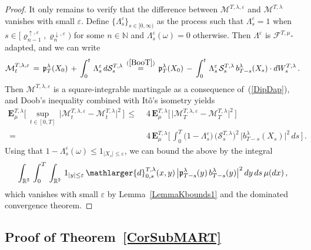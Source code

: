 \documentclass[10pt]{article}
\def\stackrel#1#2{\mathrel{\mathop{#2}\limits^{#1}}}
\numberwithin{equation}{section}
\theoremstyle{definition}
\newcommand{\R}{{\mathbb R}}
\begin{document}
\begin{proof}
It only remains to verify that the difference between $\mathcal{M}^{T,\lambda,\varepsilon}$ and $\mathcal{M}^{T,\lambda}$ vanishes with small $\varepsilon$.  Define $\{ \Lambda^{\varepsilon}_s\}_{s\in [0,\infty)}$ as the  process  such that $\Lambda^{\varepsilon}_s=1$ when $s\in \big[ \varrho_{n-1}^{\uparrow,\varepsilon} ,  \varrho_{n}^{\downarrow,\varepsilon}\big)$ for some $n\in \mathbb{N}$ and $\Lambda^{\varepsilon}_s(\omega)=0$ otherwise. Then $\Lambda^{\varepsilon}$ is $\mathscr{F}^{T,\mu}$-adapted, and we can write 
\begin{align*}
\mathcal{M}_{t}^{T,\lambda,\varepsilon}\,=\,\mathfrak{p}_{T}^{\lambda}(X_0)\,+\,\int_0^t \, \Lambda^{\varepsilon}_s \,  d\mathcal{S}^{T,\lambda}_s \,\stackrel{ (\ref{BooT}) }{=}\,\mathfrak{p}_{T}^{\lambda}(X_0)\,-\,\int_0^t  \, \Lambda^{\varepsilon}_s \,\mathcal{S}_{s}^{T,\lambda}\,b_{T-s}^{\lambda}(X_s)  \cdot dW_{s}^{T,\lambda}\,.
\end{align*}
Then $\mathcal{M}^{T,\lambda,\varepsilon}$ is a square-integrable martingale as a consequence of~(\ref{DipDap}), and Doob's inequality combined with It\^o's isometry yields 
\begin{align*}
 \mathbf{E}^{T,\lambda}_{\mu}\bigg[ \,\sup_{t\in [0,T]}\,\Big|\mathcal{M}_{t}^{T,\lambda,\varepsilon}-\mathcal{M}_{t}^{T,\lambda}\Big|^2  \,\bigg]\,\leq \, &\,4 \,\mathbf{E}^{T,\lambda}_{\mu}\bigg[ \,\Big|\mathcal{M}_{T}^{T,\lambda,\varepsilon}-\mathcal{M}_{T}^{T,\lambda}\Big|^2  \,\bigg]\nonumber \\
 \,= \, &\,4\,\mathbf{E}^{T,\lambda}_{\mu}\Bigg[\, \int_0^T \big(1-  \Lambda^{\varepsilon}_s\big) \,\big(\mathcal{S}_{s}^{T,\lambda}\big)^2\,\big|b_{T-s}^{\lambda}(X_s)\big|^2  \,ds \,\Bigg] \,.
 \end{align*}
 Using that $1-  \Lambda^{\varepsilon}_s(\omega)\leq 1_{|X_s|\leq \varepsilon }  $, we can bound the above by the integral
 \begin{align*}
  \int_{\R^2} \,\int_0^{T}\,\int_{\R^2} \,1_{|y|\leq \varepsilon} \, \mathlarger{d}_{0,s}^{T,\lambda}(x,y)\,  \big|\mathfrak{p}_{T-s}^{\lambda}(y)\,b_{T-s}^{\lambda}(y)  \big|^2\,dy\, ds\, \mu(dx) \,,  \nonumber 
\end{align*}
which vanishes with small $\varepsilon$  by Lemma~\ref{LemmaKbounds1} and the dominated convergence theorem.
\end{proof}





\subsection{Proof of Theorem~\ref{CorSubMART}}\label{SubsectionCorSubMART}
\end{document}
